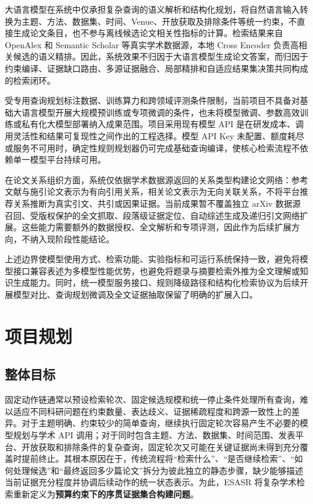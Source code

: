 \documentclass[a4paper,12pt,fontset=none]{ctexart}
\begin{document}
大语言模型在系统中仅承担复杂查询的语义解析和结构化规划，将自然语言输入转换为主题、方法、数据集、时间、Venue、开放获取及排除条件等统一约束，不直接生成论文条目，也不参与离线候选论文相关性指标的计算。检索结果来自 OpenAlex 和 Semantic Scholar 等真实学术数据源，本地 Cross Encoder 负责高相关候选的语义精排。因此，系统效果不归因于大语言模型生成论文答案，而归因于约束编译、证据缺口路由、多源证据融合、局部精排和自适应结果集决策共同构成的检索闭环。

受专用查询规划标注数据、训练算力和跨领域评测条件限制，当前项目不具备对基础大语言模型开展大规模预训练或专项微调的条件，也未将模型微调、参数高效训练或私有化大模型部署纳入成果范围。项目采用现有模型 API 是在研发成本、调用灵活性和结果可复现性之间作出的工程选择。模型 API Key 未配置、额度耗尽或服务不可用时，确定性规则规划器仍可完成基础查询编译，使核心检索流程不依赖单一模型平台持续可用。

在论文关系组织方面，系统仅依据学术数据源返回的关系类型构建论文网络：参考文献与施引论文表示为有向引用关系，相关论文表示为无向关联关系，不将平台推荐关系推断为真实引文、共引或因果证据。当前成果暂不覆盖独立 arXiv 数据源召回、受版权保护的全文抓取、段落级证据定位、自动综述生成及递归引文网络扩展。这些能力需要额外的数据授权、全文解析和专项评测，因此作为后续扩展方向，不纳入现阶段性能结论。

上述边界使模型使用方式、检索功能、实验指标和可运行系统保持一致，避免将模型接口兼容表述为多模型性能优势，也避免将题录与摘要检索外推为全文理解或知识生成能力。同时，统一模型服务接口、规则降级路径和结构化检索协议为后续开展模型对比、查询规划微调及全文证据抽取保留了明确的扩展入口。

\section{项目规划}

\subsection{整体目标}

固定动作链通常以预设检索轮次、固定候选规模和统一停止条件处理所有查询，难以适应不同科研问题在约束数量、表达歧义、证据稀疏程度和跨源一致性上的差异。对于主题明确、约束较少的简单查询，继续执行固定轮次容易产生不必要的模型规划与学术 API 调用；对于同时包含主题、方法、数据集、时间范围、发表平台、开放获取和排除条件的复杂查询，固定轮次又可能在关键证据尚未得到充分覆盖时提前终止。其根本原因在于，传统流程将``检索什么''、``是否继续检索''、``如何处理候选''和``最终返回多少篇论文''拆分为彼此独立的静态步骤，缺少能够描述当前证据充分程度并协调后续动作的统一状态表示。为此，ESASR 将复杂学术检索重新定义为\textbf{预算约束下的序贯证据集合构建问题}。
\end{document}
